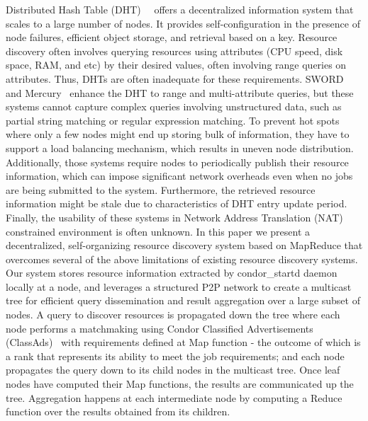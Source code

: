 \documentclass{acm_proc_article-sp}
\begin{document}
Distributed Hash Table (DHT)~\cite{chord}~\cite{pastry} offers a decentralized information system that scales to a large number of nodes. 
It provides self-configuration in the presence of node failures, efficient object storage, and retrieval based on a key. 
Resource discovery often involves querying resources using attributes (CPU speed, disk space, RAM, and etc) by their desired values, often involving range queries on attributes. 
Thus, DHTs are often inadequate for these requirements. 
SWORD~\cite{sword} and Mercury~\cite{mercury} enhance the DHT to range and multi-attribute queries, but these systems cannot capture complex queries involving unstructured data, such as partial string matching or regular expression matching. 
To prevent hot spots where only a few nodes might end up storing bulk of information, they have to support a load balancing mechanism, which results in uneven node distribution.
Additionally, those systems require nodes to periodically publish their resource information, which can impose significant network overheads even when no jobs are being submitted to the system. 
Furthermore, the retrieved resource information might be stale due to characteristics of DHT entry update period. 
Finally, the usability of these systems in Network Address Translation (NAT) constrained environment is often unknown. 
In this paper we present a decentralized, self-organizing resource discovery system based on MapReduce that overcomes several of the above limitations of existing resource discovery systems. 
Our system stores resource information extracted by condor\_startd daemon~\cite{condor} locally at a node, 
and leverages a structured P2P network to create a multicast tree for efficient query dissemination and result aggregation over a large subset of nodes. 
A query to discover resources is propagated down the tree where each node performs a matchmaking using Condor Classified Advertisements (ClassAds)~\cite{classad} with requirements defined at Map function - the outcome of which is a rank that represents its ability to meet the job requirements; 
and each node propagates the query down to its child nodes in the multicast tree. 
Once leaf nodes have computed their Map functions, the results are communicated up the tree. 
Aggregation happens at each intermediate node by computing a Reduce function over the results obtained from its children. 
\end{document}
